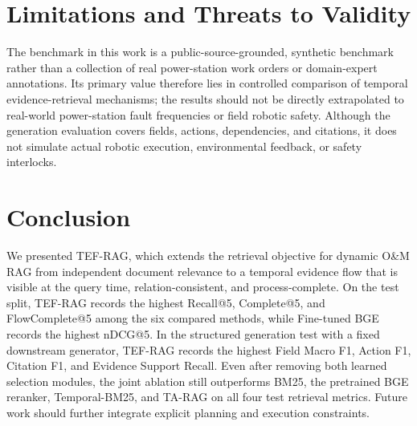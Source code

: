 \section{Limitations and Threats to Validity}
\label{sec:limitations}

The benchmark in this work is a public-source-grounded, 
synthetic benchmark rather than a collection of real 
power-station work orders or domain-expert annotations.
Its primary value therefore lies in controlled comparison of temporal evidence-retrieval mechanisms; the results should not be directly extrapolated to real-world power-station fault frequencies or field robotic safety.
Although the generation evaluation covers fields, actions, dependencies, and citations, it does not simulate actual robotic execution, environmental feedback, or safety interlocks.

\section{Conclusion}
\label{sec:conclusion}

We presented TEF-RAG, which extends the retrieval objective for dynamic O\&M RAG from independent document relevance to a temporal evidence flow that is visible at the query time, relation-consistent, and process-complete.
On the test split, TEF-RAG records the highest Recall@5, Complete@5, and FlowComplete@5 among the six compared methods, while Fine-tuned BGE records the highest nDCG@5. In the structured generation test with a fixed downstream generator, TEF-RAG records the highest Field Macro F1, Action F1, Citation F1, and Evidence Support Recall. Even after removing both learned selection modules, the joint ablation still outperforms BM25, the pretrained BGE reranker, Temporal-BM25, and TA-RAG on all four test retrieval metrics.
Future work should further integrate explicit planning and execution constraints.
